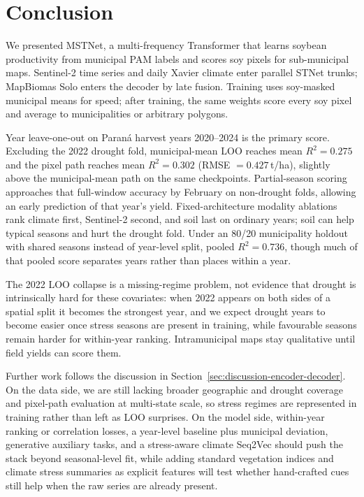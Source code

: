 \section{Conclusion}
\label{sec:conclusion}

We presented MSTNet, a multi-frequency Transformer that learns soybean productivity from municipal PAM labels and scores soy pixels for sub-municipal maps.
Sentinel-2 time series and daily Xavier climate enter parallel STNet trunks; MapBiomas Solo enters the decoder by late fusion.
Training uses soy-masked municipal means for speed; after training, the same weights score every soy pixel and average to municipalities or arbitrary polygons.

Year leave-one-out on Paran\'{a} harvest years 2020--2024 is the primary score.
Excluding the 2022 drought fold, municipal-mean LOO reaches mean $R^2=0.275$ and the pixel path reaches mean $R^2=0.302$ (RMSE $=0.427$\,\si{t/ha}), slightly above the municipal-mean path on the same checkpoints.
Partial-season scoring approaches that full-window accuracy by February on non-drought folds, allowing an early prediction of that year's yield.
Fixed-architecture modality ablations rank climate first, Sentinel-2 second, and soil last on ordinary years; soil can help typical seasons and hurt the drought fold.
Under an 80/20 municipality holdout with shared seasons instead of year-level split, pooled $R^2=0.736$, though much of that pooled score separates years rather than places within a year.

The 2022 LOO collapse is a missing-regime problem, not evidence that drought is intrinsically hard for these covariates: when 2022 appears on both sides of a spatial split it becomes the strongest year, and we expect drought years to become easier once stress seasons are present in training, while favourable seasons remain harder for within-year ranking.
Intramunicipal maps stay qualitative until field yields can score them.

Further work follows the discussion in Section~\ref{sec:discussion-encoder-decoder}.
On the data side, we are still lacking broader geographic and drought coverage and pixel-path evaluation at multi-state scale, so stress regimes are represented in training rather than left as LOO surprises.
On the model side, within-year ranking or correlation losses, a year-level baseline plus municipal deviation, generative auxiliary tasks, and a stress-aware climate Seq2Vec should push the stack beyond seasonal-level fit, while adding standard vegetation indices and climate stress summaries as explicit features will test whether hand-crafted cues still help when the raw series are already present.
